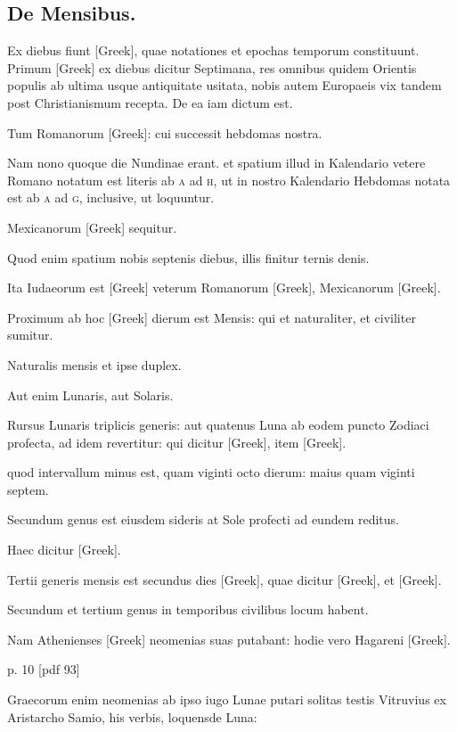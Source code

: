 \subsection{De Mensibus.}

Ex diebus fiunt \textgreek{[Greek]}, quae notationes et epochas
temporum constituunt.
Primum \textgreek{[Greek]} ex diebus dicitur Septimana,
res omnibus quidem Orientis populis ab ultima usque
antiquitate usitata,
 nobis autem Europaeis vix tandem post Christianismum
recepta.
De ea iam dictum est.

Tum Romanorum \textgreek{[Greek]}: cui
successit hebdomas nostra.

Nam nono quoque die Nundinae erant.
et spatium illud in Kalendario vetere Romano notatum est literis ab
\textsc{a} ad \textsc{h}, ut in nostro Kalendario Hebdomas
 notata est ab \textsc{a} ad \textsc{g}, inclusive,
ut loquuntur.

Mexicanorum \textgreek{[Greek]} sequitur.

Quod
enim spatium nobis septenis diebus, illis finitur ternis denis.

Ita Iudaeorum
est \textgreek{[Greek]} veterum Romanorum \textgreek{[Greek]}, Mexicanorum
\textgreek{[Greek]}.

Proximum ab hoc \textgreek{[Greek]} dierum est Mensis:
qui et naturaliter, et civiliter sumitur.

Naturalis mensis et ipse duplex.

Aut enim Lunaris, aut Solaris.

Rursus Lunaris triplicis generis:
aut quatenus Luna ab eodem puncto Zodiaci profecta, ad idem
revertitur: qui dicitur \textgreek{[Greek]}, item \textgreek{[Greek]}.

quod intervallum
minus est, quam viginti octo dierum: maius quam viginti septem.

Secundum genus est eiusdem sideris at Sole profecti ad eundem
reditus.

Haec dicitur \textgreek{[Greek]}.

Tertii generis mensis est secundus
dies \textgreek{[Greek]}, quae dicitur \textgreek{[Greek]},
 et \textgreek{[Greek]}.

Secundum et tertium genus in temporibus civilibus locum habent.

Nam Athenienses \textgreek{[Greek]} neomenias suas putabant: hodie vero
Hagareni \textgreek{[Greek]}.


p. 10 [pdf 93]

Graecorum enim neomenias ab ipso iugo
Lunae putari solitas testis Vitruvius ex Aristarcho Samio, his verbis,
loquensde Luna:

